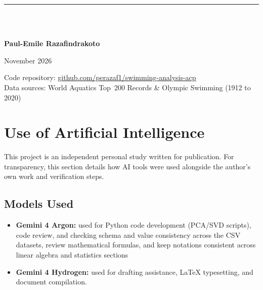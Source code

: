 \documentclass[11pt, a4paper]{article}
\begin{document}
\begin{titlepage}

    {\color{black!45}\rule{0.28\textwidth}{0.4pt}}\\[0.55cm]

    {\footnotesize\scshape{}\\[4pt]}
    {\large\bfseries Paul-Emile Razafindrakoto\par}
    \vspace{0.15cm}
    {\small\color{black!65} November 2026\par}

    \vspace{0.45cm}

    {\footnotesize\color{black!70}
    Code repository: \href{https://github.com/perazaf1/swimming-analysis-acp}{github.com/perazaf1/swimming-analysis-acp}\\
    Data sources: World Aquatics Top~200 Records \& Olympic Swimming (1912 to 2020)\par}

    \vspace*{0.4cm}

\end{titlepage}
\hypersetup{pageanchor=true}

\tableofcontents

\section*{Use of Artificial Intelligence}

This project is an independent personal study written for publication. For transparency, this section details how AI tools were used alongside the author's own work and verification steps.

\subsection*{Models Used}
\begin{itemize}
    \item \textbf{Gemini 4 Argon:} used for Python code development (PCA/SVD scripts), code review, and checking schema and value consistency across the CSV datasets, review mathematical formulas, and keep notations consistent across linear algebra and statistics sections

    \item \textbf{Gemini 4 Hydrogen:} used for drafting assistance, \LaTeX{} typesetting, and document compilation.
\end{itemize}
\end{document}
